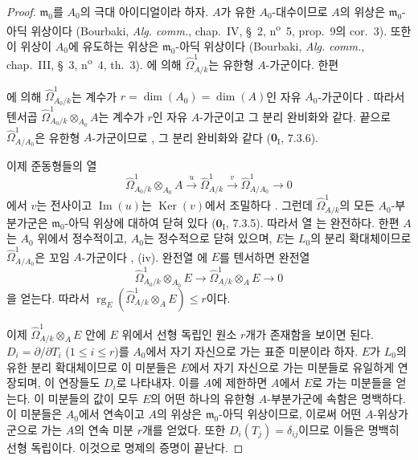 \begin{proof}
$\mathfrak m_0$를 $A_0$의 극대 아이디얼이라 하자. $A$가 유한
$A_0$-대수이므로 $A$의 위상은 $\mathfrak m_0$-아딕 위상이다
(Bourbaki, \emph{Alg. comm.}, chap.~IV, \S~2,
n\textsuperscript{o}~5, prop.~9의 cor.~3). 또한 이 위상이 $A_0$에
유도하는 위상은 $\mathfrak m_0$-아딕 위상이다
(Bourbaki, \emph{Alg. comm.}, chap.~III, \S~3,
n\textsuperscript{o}~4, th.~3). 에 의해
$\widehat\Omega^1_{A/k}$는 유한형 $A$-가군이다. 한편

에 의해 $\widehat\Omega^1_{A_0/k}$는 계수가
$r=\dim(A_0)=\dim(A)$인 자유 $A_0$-가군이다
. 따라서 텐서곱
$\widehat\Omega^1_{A_0/k}\otimes_{A_0}A$는 계수가 $r$인 자유
$A$-가군이고 그 분리 완비화와 같다. 끝으로
$\widehat\Omega^1_{A/A_0}$은 유한형 $A$-가군이므로
, 그 분리 완비화와 같다
($\mathbf 0_{\mathrm I}$, 7.3.6).

이제 준동형들의 열
\begin{equation}
\tag{21.9.5.2}
\label{0.21.9.5.2-ko}
  \widehat\Omega^1_{A_0/k}\otimes_{A_0}A
  \xrightarrow{u}\widehat\Omega^1_{A/k}
  \xrightarrow{v}\widehat\Omega^1_{A/A_0}\longrightarrow0
\end{equation}
에서 $v$는 전사이고 $\operatorname{Im}(u)$는
$\operatorname{Ker}(v)$에서 조밀하다 . 그런데
$\widehat\Omega^1_{A/k}$의 모든 $A_0$-부분가군은
$\mathfrak m_0$-아딕 위상에 대하여 닫혀 있다
($\mathbf 0_{\mathrm I}$, 7.3.5). 따라서 열
는 완전하다. 한편 $A$는 $A_0$ 위에서 정수적이고,
$A_0$는 정수적으로 닫혀 있으며, $E$는 $L_0$의 분리 확대체이므로
$\widehat\Omega^1_{A/A_0}$은 꼬임 $A$-가군이다
, (iv). 완전열 에 $E$를
텐서하면 완전열
\[
  \widehat\Omega^1_{A_0/k}\otimes_{A_0}E
  \longrightarrow \widehat\Omega^1_{A/k}\otimes_AE
  \longrightarrow0
\]
을 얻는다. 따라서
$\operatorname{rg}_E(\widehat\Omega^1_{A/k}\otimes_AE)\leqslant r$이다.

이제 $\widehat\Omega^1_{A/k}\otimes_AE$ 안에 $E$ 위에서 선형
독립인 원소 $r$개가 존재함을 보이면 된다. $D_i=\partial/\partial T_i$
($1\leqslant i\leqslant r$)를 $A_0$에서 자기 자신으로 가는 표준
미분이라 하자. $E$가 $L_0$의 유한 분리 확대체이므로 이 미분들은
$E$에서 자기 자신으로 가는 미분들로 유일하게 연장되며, 이 연장들도
$D_i$로 나타내자. 이를 $A$에 제한하면 $A$에서 $E$로 가는 미분들을
얻는다. 이 미분들의 값이 모두 $E$의 어떤 하나의 유한형
$A$-부분가군에 속함은 명백하다. 이 미분들은 $A_0$에서 연속이고
$A$의 위상은 $\mathfrak m_0$-아딕 위상이므로, 이로써 어떤
$A$-위상가군으로 가는 $A$의 연속 미분 $r$개를 얻었다. 또한
$D_i(T_j)=\delta_{ij}$이므로 이들은 명백히 선형 독립이다. 이것으로
명제의 증명이 끝난다.
\end{proof}

